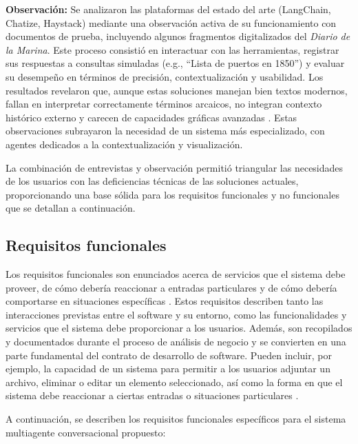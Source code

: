 \textbf{Observación:} Se analizaron las plataformas del estado del arte (LangChain, Chatize, Haystack) mediante una observación activa de su funcionamiento con documentos de prueba, incluyendo algunos fragmentos digitalizados del \textit{Diario de la Marina}. Este proceso consistió en interactuar con las herramientas, registrar sus respuestas a consultas simuladas (e.g., ``Lista de puertos en 1850'') y evaluar su desempeño en términos de precisión, contextualización y usabilidad. Los resultados revelaron que, aunque estas soluciones manejan bien textos modernos, fallan en interpretar correctamente términos arcaicos, no integran contexto histórico externo y carecen de capacidades gráficas avanzadas \cite{lewis2020retrieval, langchain2023}. Estas observaciones subrayaron la necesidad de un sistema más especializado, con agentes dedicados a la contextualización y visualización.

La combinación de entrevistas y observación permitió triangular las necesidades de los usuarios con las deficiencias técnicas de las soluciones actuales, proporcionando una base sólida para los requisitos funcionales y no funcionales que se detallan a continuación.



\subsection{Requisitos funcionales}

Los requisitos funcionales son enunciados acerca de servicios que el sistema debe proveer, de cómo debería reaccionar a entradas particulares y de cómo debería comportarse en situaciones específicas \cite{sommerville2011software}. Estos requisitos describen tanto las interacciones previstas entre el software y su entorno, como las funcionalidades y servicios que el sistema debe proporcionar a los usuarios. Además, son recopilados y documentados durante el proceso de análisis de negocio y se convierten en una parte fundamental del contrato de desarrollo de software. Pueden incluir, por ejemplo, la capacidad de un sistema para permitir a los usuarios adjuntar un archivo, eliminar o editar un elemento seleccionado, así como la forma en que el sistema debe reaccionar a ciertas entradas o situaciones particulares \cite{chanchi2019propuesta}.

A continuación, se describen los requisitos funcionales específicos para el sistema multiagente conversacional propuesto:

